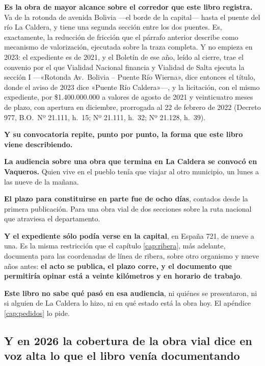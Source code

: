 \textbf{Es la obra de mayor alcance sobre el corredor que este libro registra.} Va de la rotonda
de avenida Bolivia ---el borde de la capital--- hasta el puente del río La Caldera, y tiene una
segunda sección entre los dos puentes. Es, exactamente, la reducción de fricción que el párrafo
anterior describe como mecanismo de valorización, ejecutada sobre la traza completa. Y no empieza en 2023: el expediente es de 2021, y el Boletín de ese año, leído al cierre, trae el convenio por el que Vialidad Nacional financia y Vialidad de Salta ejecuta la sección I ---«Rotonda Av.\ Bolivia -- Puente Río Wierna», dice entonces el título, donde el aviso de 2023 dice «Puente Río Caldera»---, y la licitación, con el mismo expediente, por \$1.400.000.000 a valores de agosto de 2021 y veinticuatro meses de plazo, con apertura en diciembre, prorrogada al 22 de febrero de 2022 (Decreto 977, B.O.\ Nº 21.111, h.\ 15; Nº 21.111, h.\ 32; Nº 21.128, h.\ 39).

\begin{cautela}
\textbf{Y su convocatoria repite, punto por punto, la forma que este libro viene describiendo.}

\textbf{La audiencia sobre una obra que termina en La Caldera se convocó en Vaqueros.} Quien vive
en el pueblo tenía que viajar al otro municipio, un lunes a las nueve de la mañana.

\textbf{El plazo para constituirse en parte fue de ocho días}, contados desde la primera
publicación. Para una obra vial de dos secciones sobre la ruta nacional que atraviesa el
departamento.

\textbf{Y el expediente sólo podía verse en la capital}, en España 721, de nueve a una. Es la
misma restricción que el capítulo \ref{cap:ribera}, más adelante, documenta para las coordenadas de línea de
ribera, sobre otro organismo y nueve años antes: \textbf{el acto se publica, el plazo corre, y
el documento que permitiría opinar está a veinte kilómetros y en horario de trabajo}.

\textbf{Este libro no sabe qué pasó en esa audiencia}, ni quiénes se presentaron, ni si alguien
de La Caldera lo hizo, ni en qué estado está la obra hoy. El apéndice \ref{cap:pedidos} lo pide.
\end{cautela}

\subsection*{Y en 2026 la cobertura de la obra vial dice en voz alta lo que el libro venía documentando}

